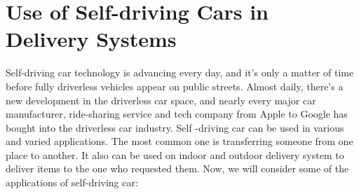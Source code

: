 \section{Use of Self-driving Cars in Delivery Systems}
\hspace{2cm} Self-driving car technology is advancing every day, and it's only a matter of time before fully driverless vehicles appear on public streets.
Almost daily, there's a new development in the driverless car space, and nearly every major car manufacturer, ride-sharing service and tech company from Apple to Google has bought into the driverless car industry. 
Self -driving car can be used in various and varied applications. The most common one is transferring someone from one place to another. It also can be used on indoor and outdoor delivery system to deliver items to the one who requested them. Now, we will consider some of the applications of self-driving car:
\par
